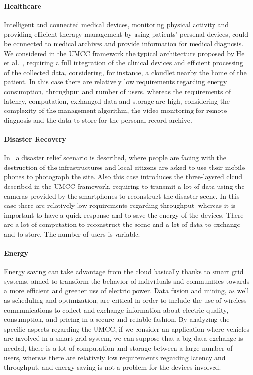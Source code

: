 \documentclass[twoside,openright]{report}
\begin{document}
\paragraph{Healthcare}
Intelligent and connected medical devices, monitoring physical activity and providing efficient therapy management by using patients' personal devices, could be connected to medical archives and provide information for medical diagnosis. We considered in the \gls{UMCC} framework the typical architecture proposed by He et al.~\cite{HEALTH}, requiring a full integration of the clinical devices and efficient processing of the collected data, considering, for instance, a cloudlet nearby the home of the patient. 
In this case there are relatively low requirements regarding energy consumption, throughput and number of users, whereas the requirements of latency, computation, exchanged data and storage are high, considering the complexity of the management algorithm, the video monitoring for remote diagnosis and the data to store for the personal record archive.

\paragraph{Disaster Recovery}
In~\cite{Satyanarayanan} a disaster relief scenario is described, where people are facing with the destruction of the infrastructures and local citizens are asked to use their mobile phones to photograph the site. 
Also this case introduces the three-layered cloud described in the \gls{UMCC} framework, requiring to transmit a lot of data using the cameras provided by the smartphones to reconstruct the disaster scene. 
In this case there are relatively low requirements regarding throughput, whereas it is important to have a quick response and to save the energy of the devices. 
There are a lot of computation to reconstruct the scene and a lot of data to exchange and to store. 
The number of users is variable.

\paragraph{Energy}
Energy saving can take advantage from the cloud basically thanks to smart grid systems, aimed to transform the behavior of individuals and communities towards a more efficient and greener use of electric power.
Data fusion and mining, as well as scheduling and optimization, are critical in order to include the use of wireless communications to collect and exchange information about electric quality, consumption, and pricing in a secure and reliable fashion. 
By analyzing the specific aspects regarding the \gls{UMCC}, if we consider an application where vehicles are involved in a smart grid system, we can suppose that a big data exchange is needed, there is a lot of computation and storage between a large number of users, whereas there are relatively low requirements regarding latency and throughput, and energy saving is not a problem for the devices involved.
\end{document}
